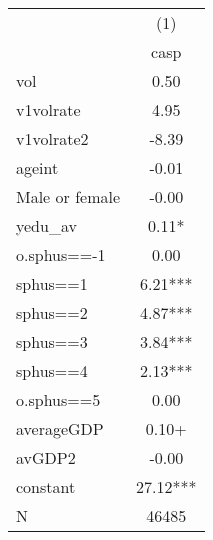 {
\def\sym#1{\ifmmode^{#1}\else\(^{#1}\)\fi}
\begin{tabular}{l*{1}{c}}
\hline\hline
                    &\multicolumn{1}{c}{(1)}\\
                    &\multicolumn{1}{c}{casp}\\
\hline
vol                 &        0.50   \\
v1volrate           &        4.95   \\
v1volrate2          &       -8.39   \\
ageint              &       -0.01   \\
Male or female      &       -0.00   \\
yedu\_av             &        0.11*  \\
o.sphus==-1         &        0.00   \\
sphus==1            &        6.21***\\
sphus==2            &        4.87***\\
sphus==3            &        3.84***\\
sphus==4            &        2.13***\\
o.sphus==5          &        0.00   \\
averageGDP          &        0.10+  \\
avGDP2              &       -0.00   \\
constant            &       27.12***\\
\hline
N                   &       46485   \\
\hline\hline
\end{tabular}
}
